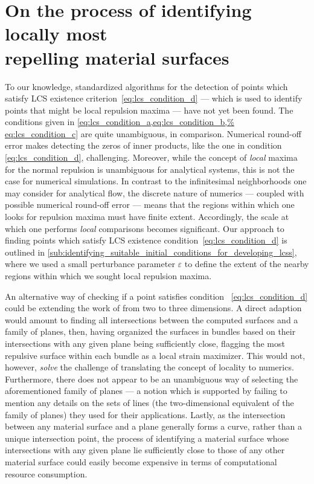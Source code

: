 \section[On the process of identifying locally most repelling material
surfaces]{On the process of identifying locally most \\\phantom{5.3} repelling
    material surfaces}
\label{sec:on_the_process_of_identifying_locally_most_normally_repelling_material_surfaces}

To our knowledge, standardized algorithms for the detection of points which
satisfy LCS existence criterion~\eqref{eq:lcs_condition_d} --- which is used to
identify points that might be local repulsion maxima --- have not yet been
found. The conditions given in \cref{eq:lcs_condition_a,eq:lcs_condition_b,%
eq:lcs_condition_c} are quite unambiguous, in comparison. Numerical round-off
error makes detecting the zeros of inner products, like the one in condition~%
\eqref{eq:lcs_condition_d}, challenging. Moreover, while the concept of
\emph{local} maxima for the normal repulsion is unambiguous for analytical
systems, this is not the case for numerical simulations. In contrast to the
infinitesimal neighborhoods one may consider for analytical flow, the discrete
nature of numerics --- coupled with possible numerical round-off error ---
means that the regions within which one looks for repulsion maxima must have
finite extent. Accordingly, the scale at which one performs \emph{local}
comparisons becomes significant. Our approach to finding points which satisfy
LCS existence condition~\eqref{eq:lcs_condition_d} is outlined in
\cref{sub:identifying_suitable_initial_conditions_for_developing_lcss}, where
we used a small perturbance parameter $\varepsilon$ to define the extent of the
nearby regions within which we sought local repulsion maxima.

An alternative way of checking if a point satisfies condition~%
\eqref{eq:lcs_condition_d} could be extending the work of
\textcite{farazmand2012computing} from two to three dimensions. A direct
adaption would amount to finding all intersections between the computed
surfaces and a family of planes, then, having organized the surfaces in bundles
based on their intersections with any given plane being sufficiently close,
flagging the most repulsive surface within each bundle as a local strain
maximizer. This would not, however, \emph{solve} the challenge of translating
the concept of locality to numerics. Furthermore, there does not appear to be
an unambiguous way of selecting the aforementioned family of planes --- a
notion which is supported by \citeauthor{farazmand2012computing} failing to
mention any details on the sets of lines (the two-dimensional equivalent of
the family of planes) they used for their applications. Lastly, as the
intersection between any material surface and a plane generally forms a
curve, rather than a unique intersection point, the process of identifying a
material surface whose intersections with any given plane lie sufficiently
close to those of any other material surface could easily become expensive in
terms of computational resource consumption.

